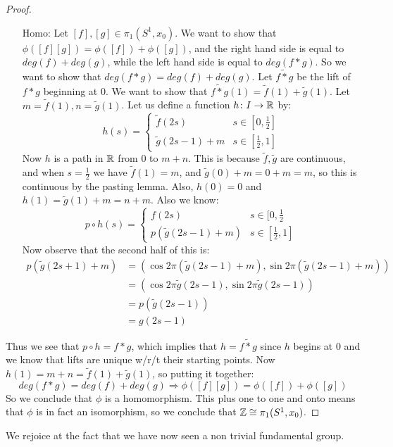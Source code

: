 \begin{proof}
\begin{itemize}
		\item[Homo:] Let $[f],[g]\in \pi_1(S^1, x_0)$. We want to show that $\phi([f][g])=\phi([f])+\phi([g])$, and the right hand side is equal to $deg(f)+deg(g)$, while the left hand side is equal to $deg(f\ast g)$. So we want to show that $deg(f\ast g)=deg(f)+deg(g)$. Let $\widetilde{f\ast g}$ be the lift of $f\ast g$ beginning at $0$. We want to show that $\widetilde{f\ast g}(1)=\widetilde{f}(1)+\widetilde{g}(1)$. Let $m=\widetilde{f}(1), n=\widetilde{g}(1)$. Let us define a function $h\colon I\to \mathbb R$ by:
		\[h(s)=
		\begin{cases}
			\widetilde{f}(2s) & s\in [0,\frac{1}{2}]\\
			\widetilde{g}(2s-1)+m & s\in [\frac{1}{2},1] 
		\end{cases}
		\]
		Now $h$ is a path in $\mathbb R$ from $0$ to $m+n$. This is because $\widetilde{f}, \widetilde{g}$ are continuous, and when $s=\frac{1}{2}$ we have $\widetilde{f}(1)=m$, and $\widetilde{g}(0)+m=0+m=m$, so this is continuous by the pasting lemma. Also, $h(0)=0$ and $h(1)=\widetilde{g}(1)+m=n+m$. Also we know:
		\[p\circ h(s)=
		\begin{cases}
			f(2s) & s\in [0,\frac{1}{2}\\
			p(\widetilde{g}(2s-1)+m) & s\in [\frac{1}{2},1] 
		\end{cases}
		\]
		Now observe that the second half of this is: 
		\begin{align*}
			p(\widetilde{g}(2s+1)+m)&=(\cos 2\pi (\widetilde{g}(2s-1)+m), \sin2\pi (\widetilde{g}(2s-1)+m))\\
			&=(\cos 2\pi \widetilde{g}(2s-1),\sin2\pi \widetilde{g}(2s-1))\\
			&=p(\widetilde{g}(2s-1))\\
			&=g(2s-1) 
		\end{align*}
	\end{itemize}
	Thus we see that $p\circ h=f\ast g$, which implies that $h=\widetilde{f\ast g}$ since $h$ begins at $0$ and we know that lifts are unique w/r/t their starting points. Now $h(1)=m+n=\widetilde{f}(1)+\widetilde{g}(1)$, so putting it together:
	\[deg(f\ast g)=deg(f)+deg(g)\Rightarrow \phi([f][g])=\phi([f])+\phi([g])\]
	So we conclude that $\phi$ is a homomorphism. This plus one to one and onto means that $\phi$ is in fact an isomorphism, so we conclude that $\mathbb Z\cong \pi_1(S^1,x_0)$. 
\end{proof}
We rejoice at the fact that we have now seen a non trivial fundamental group. 

